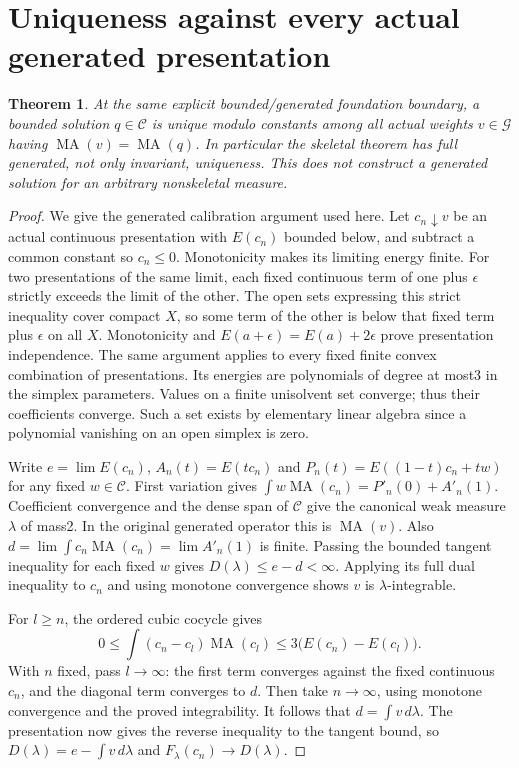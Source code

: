 \documentclass[11pt]{article}
\newtheorem{theorem}{Theorem}
\newcommand{\MA}{\operatorname{MA}}
\newcommand{\C}{\mathcal C}
\begin{document}
\section{Uniqueness against every actual generated presentation}
\begin{theorem}\label{newrad:Gunique}
At the same explicit bounded/generated foundation boundary, a bounded
solution $q\in\C$ is unique modulo constants among \emph{all}
actual weights $v\in\mathcal G$ having $\MA(v)=\MA(q)$.
In particular the skeletal theorem has full generated, not only
invariant, uniqueness. This does not construct a generated solution
for an arbitrary nonskeletal measure.
\end{theorem}
\begin{proof}
We give the generated calibration argument used here. Let
$c_n\downarrow v$ be an actual continuous presentation with
$E(c_n)$ bounded below, and subtract a common constant so $c_n\le0$.
Monotonicity makes its limiting energy finite. For two presentations
of the same limit, each fixed continuous term of one plus $\epsilon$
strictly exceeds the limit of the other. The open sets expressing
this strict inequality cover compact $X$, so some term of the other
is below that fixed term plus $\epsilon$ on all $X$. Monotonicity
and $E(a+\epsilon)=E(a)+2\epsilon$ prove presentation independence.
The same argument applies to every fixed finite convex combination
of presentations. Its energies are polynomials of degree at most3
in the simplex parameters. Values on a finite unisolvent set converge;
thus their coefficients converge. Such a set exists by elementary
linear algebra since a polynomial vanishing on an open simplex is zero.

Write $e=\lim E(c_n)$, $A_n(t)=E(tc_n)$ and
$P_n(t)=E((1-t)c_n+tw)$ for any fixed $w\in\C$.
First variation gives
$\int w\MA(c_n)=P'_n(0)+A'_n(1)$. Coefficient convergence and
the dense span of $\C$ give the canonical weak measure $\lambda$
of mass2. In the original generated operator this is $\MA(v)$.
Also $d=\lim\int c_n\MA(c_n)=\lim A'_n(1)$ is finite.
Passing the bounded tangent inequality for each fixed $w$ gives
$D(\lambda)\le e-d<\infty$. Applying its full dual inequality
to $c_n$ and using monotone convergence shows $v$ is
$\lambda$-integrable.

For $l\ge n$, the ordered cubic cocycle gives
\[
 0\le\int(c_n-c_l)\MA(c_l)
 \le3\bigl(E(c_n)-E(c_l)\bigr).
\]
With $n$ fixed, pass $l\to\infty$: the first term converges against
the fixed continuous $c_n$, and the diagonal term converges to $d$.
Then take $n\to\infty$, using monotone convergence and the proved
integrability. It follows that $d=\int v\,d\lambda$.
The presentation now gives the reverse inequality to the tangent bound,
so $D(\lambda)=e-\int v\,d\lambda$ and
$F_\lambda(c_n)\to D(\lambda)$.


\end{proof}
\end{document}
